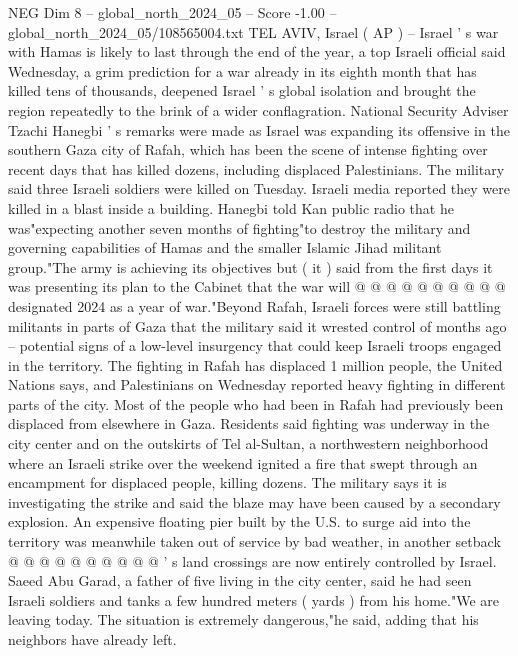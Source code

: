 \begin{textsample}{NEG Dim 8 – global\_north\_2024\_05 – Score -1.00 – global\_north\_2024\_05/108565004.txt}  \label{ex:f8_neg_275}
TEL AVIV, Israel ( AP ) -- Israel ' s war with Hamas is likely to last through the end of the year, a top Israeli official said Wednesday, a grim prediction for a war already in its eighth month that has killed tens of thousands, deepened Israel ' s global isolation and brought the region repeatedly to the brink of a wider conflagration.
National Security Adviser Tzachi Hanegbi ' s remarks were made as Israel was expanding its offensive in the southern Gaza city of Rafah, which has been the scene of intense fighting over recent days that has killed dozens, including displaced Palestinians.
The military said three Israeli soldiers were killed on Tuesday.
Israeli media reported they were killed in a blast inside a building.
Hanegbi told Kan public radio that he was"expecting another seven months of fighting"to destroy the military and governing capabilities of Hamas and the smaller Islamic Jihad militant group."The army is achieving its objectives but ( it ) said from the first days it was presenting its plan to the Cabinet that the war will @ @ @ @ @ @ @ @ @ @ designated 2024 as a year of war."Beyond Rafah, Israeli forces were still battling militants in parts of Gaza that the military said it wrested control of months ago -- potential signs of a low-level insurgency that could keep Israeli troops engaged in the territory.
The fighting in Rafah has displaced 1 million people, the United Nations says, and Palestinians on Wednesday reported heavy fighting in different parts of the city.
Most of the people who had been in Rafah had previously been displaced from elsewhere in Gaza.
Residents said fighting was underway in the city center and on the outskirts of Tel al-Sultan, a northwestern neighborhood where an Israeli strike over the weekend ignited a fire that swept through an encampment for displaced people, killing dozens.
The military says it is investigating the strike and said the blaze may have been caused by a secondary explosion.
An expensive floating pier built by the U.S. to surge aid into the territory was meanwhile taken out of service by bad weather, in another setback @ @ @ @ @ @ @ @ @ @ ' s land crossings are now entirely controlled by Israel.
Saeed Abu Garad, a father of five living in the city center, said he had seen Israeli soldiers and tanks a few hundred meters ( yards ) from his home."We are leaving today.
The situation is extremely dangerous,"he said, adding that his neighbors have already left.

\end{textsample}
